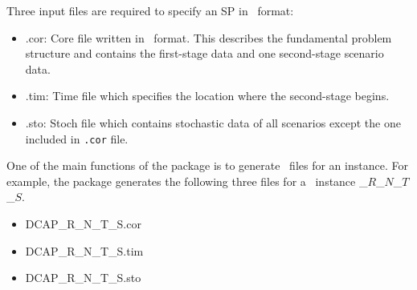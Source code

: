 Three input files are required to specify an SP in \smps\ format:
\begin{itemize}
	\item .cor: Core file written in \mps\ format. This describes the fundamental problem structure and contains the first-stage data and one second-stage scenario data.
	\item .tim: Time file which specifies the location where the second-stage begins.
	\item .sto: Stoch file which contains stochastic data of all scenarios except the one included in \texttt{.cor} file.
\end{itemize}
One of the main functions of the package is to generate \smps\ files for an instance. For example, the package generates the following three files for a \dcap\ instance \dcap\_$R$\_$N$\_$T$\_$S$.
\begin{itemize}
	\item DCAP\_R\_N\_T\_S.cor
	\item DCAP\_R\_N\_T\_S.tim
	\item DCAP\_R\_N\_T\_S.sto
\end{itemize}

